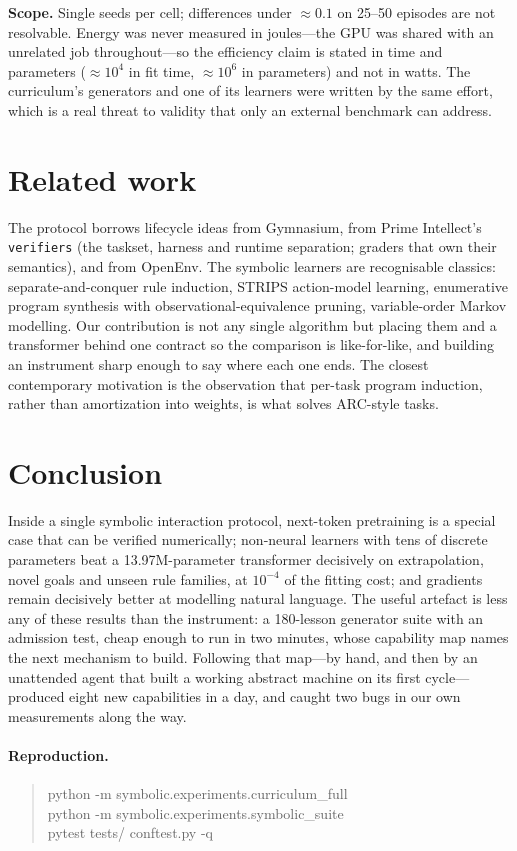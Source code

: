 \documentclass[11pt]{article}
\newcommand{\code}[1]{\texttt{\small #1}}
\begin{document}
\textbf{Scope.} Single seeds per cell; differences under $\approx0.1$ on 25--50
episodes are not resolvable. Energy was never measured in joules---the GPU was
shared with an unrelated job throughout---so the efficiency claim is stated in
time and parameters ($\approx10^4$ in fit time, $\approx10^6$ in parameters) and
not in watts. The curriculum's generators and one of its learners were written by
the same effort, which is a real threat to validity that only an external
benchmark can address.

\section{Related work}

The protocol borrows lifecycle ideas from Gymnasium, from Prime Intellect's
\code{verifiers} (the taskset, harness and runtime separation; graders that own their
semantics), and from OpenEnv. The symbolic learners are recognisable classics:
separate-and-conquer rule induction, STRIPS action-model learning, enumerative
program synthesis with observational-equivalence pruning, variable-order Markov
modelling. Our contribution is not any single algorithm but placing them and a
transformer behind one contract so the comparison is like-for-like, and building
an instrument sharp enough to say where each one ends. The closest contemporary
motivation is the observation that per-task program induction, rather than
amortization into weights, is what solves ARC-style tasks.

\section{Conclusion}

Inside a single symbolic interaction protocol, next-token pretraining is a
special case that can be verified numerically; non-neural learners with tens of
discrete parameters beat a 13.97M-parameter transformer decisively on
extrapolation, novel goals and unseen rule families, at $10^{-4}$ of the fitting
cost; and gradients remain decisively better at modelling natural language. The
useful artefact is less any of these results than the instrument: a 180-lesson
generator suite with an admission test, cheap enough to run in two minutes, whose
capability map names the next mechanism to build. Following that map---by hand, and then by an unattended agent that built a
working abstract machine on its first cycle---produced eight new capabilities in
a day, and caught two bugs in our own measurements along the way.

\small
\paragraph{Reproduction.}
\begin{quote}\ttfamily\scriptsize
python -m symbolic.experiments.curriculum\_full\\
python -m symbolic.experiments.symbolic\_suite\\
pytest tests/ conftest.py -q
\end{quote}
\end{document}
